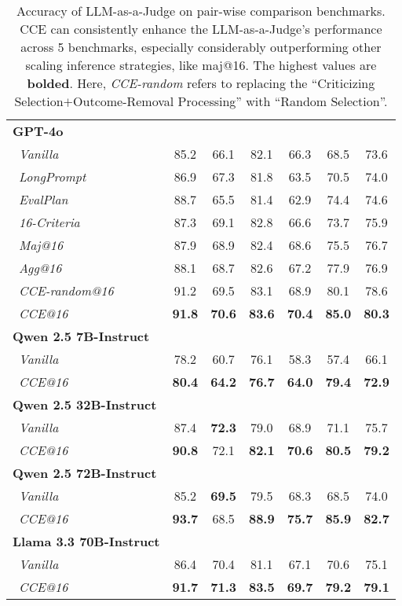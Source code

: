\begin{table*}[!t]
{\begin{tabular}{lcccccc}
\midrule
\textbf{GPT-4o} \\
~\textit{Vanilla}&85.2&66.1&82.1&66.3&68.5&73.6\\
~\textit{LongPrompt}&86.9&67.3&81.8&63.5&70.5&74.0 \\
~\textit{EvalPlan}&88.7&65.5&81.4&62.9&74.4&74.6 \\
~\textit{16-Criteria} &87.3&69.1&82.8&66.6&73.7&75.9\\
~\textit{Maj@16} &87.9&68.9&82.4&68.6&75.5&76.7\\
~\textit{Agg@16} &88.1&68.7&82.6&67.2&77.9&76.9\\
\rowcolor{green!10}
~\textit{\textsc{CCE}-random@16} &91.2&69.5&83.1&68.9&80.1&78.6\\
\rowcolor{green!10}
~\textit{\textsc{CCE}@16} &\textbf{91.8}&\textbf{70.6}&\textbf{83.6}&\textbf{70.4}&\textbf{85.0}&\textbf{80.3}\\
\midrule
\textbf{Qwen 2.5 7B-Instruct} \\
~\textit{Vanilla}&78.2&60.7&76.1&58.3&57.4&66.1\\
\rowcolor{green!10}
~\textit{\textsc{CCE}@16}&\textbf{80.4}&\textbf{64.2}&\textbf{76.7}&\textbf{64.0}&\textbf{79.4}&\textbf{72.9}\\
\midrule
\textbf{Qwen 2.5 32B-Instruct} \\
~\textit{Vanilla}&87.4&\textbf{72.3}&79.0&68.9&71.1&75.7\\
\rowcolor{green!10}
~\textit{\textsc{CCE}@16}&\textbf{90.8}&72.1&\textbf{82.1}&\textbf{70.6}&\textbf{80.5}&\textbf{79.2}\\
\midrule
\textbf{Qwen 2.5 72B-Instruct} \\
~\textit{Vanilla}&85.2&\textbf{69.5}&79.5&68.3&68.5&74.0\\
\rowcolor{green!10}
~\textit{\textsc{CCE}@16}&\textbf{93.7}&68.5&\textbf{88.9}&\textbf{75.7}&\textbf{85.9}&\textbf{82.7}\\
\midrule
\textbf{Llama 3.3 70B-Instruct} \\
~\textit{Vanilla}&86.4&70.4&81.1&67.1&70.6&75.1\\
\rowcolor{green!10}
~\textit{\textsc{CCE}@16}&\textbf{91.7}&\textbf{71.3}&\textbf{83.5}&\textbf{69.7}&\textbf{79.2}&\textbf{79.1}\\
\bottomrule
\end{tabular}
}
\caption{Accuracy of LLM-as-a-Judge on pair-wise comparison benchmarks. \textsc{CCE} can consistently enhance the LLM-as-a-Judge's performance across 5 benchmarks, especially considerably outperforming other scaling inference strategies, like maj@16. The highest values are \textbf{bolded}. Here, \textit{\textsc{CCE}-random} refers to replacing the ``Criticizing Selection$+$Outcome-Removal Processing'' with ``Random Selection''.
}
\label{tab:main_preference}
\end{table*}




